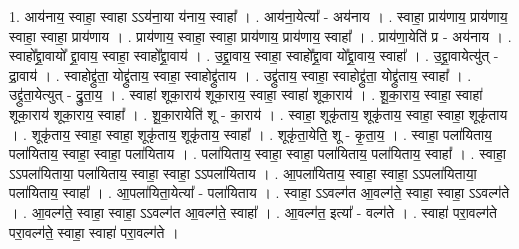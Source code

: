 \documentclass[17pt]{extarticle}
\begin{document}
1. आय॑नाय॒ स्वाहा॒ स्वाहा ऽऽय॑ना॒या य॑नाय॒ स्वाहा᳚ । . आय॑ना॒येत्या᳚ - अय॑नाय । . स्वाहा॒ प्राय॑णाय॒ प्राय॑णाय॒ स्वाहा॒ स्वाहा॒ प्राय॑णाय । . प्राय॑णाय॒ स्वाहा॒ स्वाहा॒ प्राय॑णाय॒ प्राय॑णाय॒ स्वाहा᳚ । . प्राय॑णा॒येति॑ प्र - अय॑नाय । . स्वाहो᳚द्द्रा॒वायो᳚ द्द्रा॒वाय॒ स्वाहा॒ स्वाहो᳚द्द्रा॒वाय॑ । . उ॒द्द्रा॒वाय॒ स्वाहा॒ स्वाहो᳚द्द्रा॒वा यो᳚द्द्रा॒वाय॒ स्वाहा᳚ । . उ॒द्द्रा॒वायेत्यु॑त् - द्रा॒वाय॑ । . स्वाहोद्द्रु॑ता॒ योद्द्रु॑ताय॒ स्वाहा॒ स्वाहोद्द्रु॑ताय । . उद्द्रु॑ताय॒ स्वाहा॒ स्वाहोद्द्रु॑ता॒ योद्द्रु॑ताय॒ स्वाहा᳚ । . उद्द्रु॑ता॒येत्युत् - द्रु॒ता॒य॒ । . स्वाहा॑ शूका॒राय॑ शूका॒राय॒ स्वाहा॒ स्वाहा॑ शूका॒राय॑ । . शू॒का॒राय॒ स्वाहा॒ स्वाहा॑ शूका॒राय॑ शूका॒राय॒ स्वाहा᳚ । . शू॒का॒रायेति॑ शू - का॒राय॑ । . स्वाहा॒ शूकृ॑ताय॒ शूकृ॑ताय॒ स्वाहा॒ स्वाहा॒ शूकृ॑ताय । . शूकृ॑ताय॒ स्वाहा॒ स्वाहा॒ शूकृ॑ताय॒ शूकृ॑ताय॒ स्वाहा᳚ । . शूकृ॑ता॒येति॒ शू - कृ॒ता॒य॒ । . स्वाहा॒ पला॑यिताय॒ पला॑यिताय॒ स्वाहा॒ स्वाहा॒ पला॑यिताय । . पला॑यिताय॒ स्वाहा॒ स्वाहा॒ पला॑यिताय॒ पला॑यिताय॒ स्वाहा᳚ । . स्वाहा॒ ऽऽपला॑यिताया॒ पला॑यिताय॒ स्वाहा॒ स्वाहा॒ ऽऽपला॑यिताय । . आ॒पला॑यिताय॒ स्वाहा॒ स्वाहा॒ ऽऽपला॑यिताया॒ पला॑यिताय॒ स्वाहा᳚ । . आ॒पला॑यिता॒येत्या᳚ - पला॑यिताय । . स्वाहा॒ ऽऽवल्ग॑त आ॒वल्ग॑ते॒ स्वाहा॒ स्वाहा॒ ऽऽवल्ग॑ते । . आ॒वल्ग॑ते॒ स्वाहा॒ स्वाहा॒ ऽऽवल्ग॑त आ॒वल्ग॑ते॒ स्वाहा᳚ । . आ॒वल्ग॑त॒ इत्या᳚ - वल्ग॑ते । . स्वाहा॑ परा॒वल्ग॑ते परा॒वल्ग॑ते॒ स्वाहा॒ स्वाहा॑ परा॒वल्ग॑ते । \newline
\end{document}
